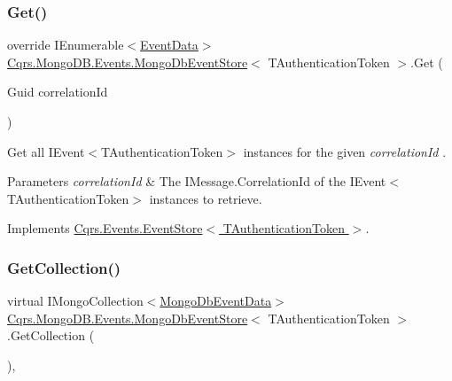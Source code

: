 \subsubsection{\texorpdfstring{Get()}{Get()}\hspace{0.1cm}{\footnotesize\ttfamily [2/2]}}
{\footnotesize\ttfamily override I\+Enumerable$<$\hyperlink{classCqrs_1_1Events_1_1EventData}{Event\+Data}$>$ \hyperlink{classCqrs_1_1MongoDB_1_1Events_1_1MongoDbEventStore}{Cqrs.\+Mongo\+D\+B.\+Events.\+Mongo\+Db\+Event\+Store}$<$ T\+Authentication\+Token $>$.Get (\begin{DoxyParamCaption}\item[{Guid}]{correlation\+Id }\end{DoxyParamCaption})\hspace{0.3cm}{\ttfamily [virtual]}}



Get all I\+Event$<$\+T\+Authentication\+Token$>$ instances for the given {\itshape correlation\+Id} . 


\begin{DoxyParams}{Parameters}
{\em correlation\+Id} & The I\+Message.\+Correlation\+Id of the I\+Event$<$\+T\+Authentication\+Token$>$ instances to retrieve.\\
\hline
\end{DoxyParams}


Implements \hyperlink{classCqrs_1_1Events_1_1EventStore_a0096646f5dff730b0041b9469719c420_a0096646f5dff730b0041b9469719c420}{Cqrs.\+Events.\+Event\+Store$<$ T\+Authentication\+Token $>$}.

\mbox{\label{classCqrs_1_1MongoDB_1_1Events_1_1MongoDbEventStore_aa6a9499aa1dcde55d82d8e0f3b5bd077_aa6a9499aa1dcde55d82d8e0f3b5bd077}} 
\subsubsection{\texorpdfstring{Get\+Collection()}{GetCollection()}}
{\footnotesize\ttfamily virtual I\+Mongo\+Collection$<$\hyperlink{classCqrs_1_1MongoDB_1_1Events_1_1MongoDbEventData}{Mongo\+Db\+Event\+Data}$>$ \hyperlink{classCqrs_1_1MongoDB_1_1Events_1_1MongoDbEventStore}{Cqrs.\+Mongo\+D\+B.\+Events.\+Mongo\+Db\+Event\+Store}$<$ T\+Authentication\+Token $>$.Get\+Collection (\begin{DoxyParamCaption}{ }\end{DoxyParamCaption})\hspace{0.3cm}{\ttfamily [protected]}, {\ttfamily [virtual]}}

